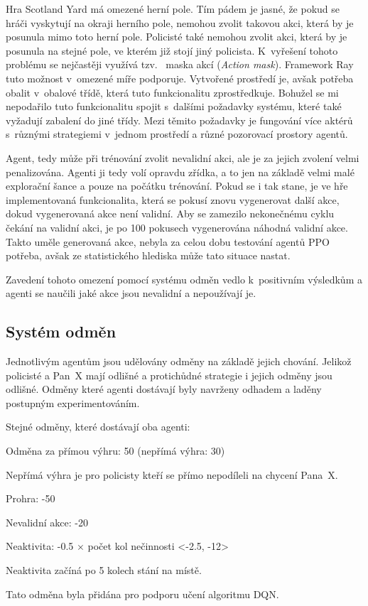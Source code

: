 Hra Scotland Yard má omezené herní pole.
Tím pádem je jasné, že pokud se hráči vyskytují na okraji herního pole, nemohou zvolit takovou akci, která by je posunula mimo toto herní pole.
Policisté také nemohou zvolit akci, která by je posunula na stejné pole, ve kterém již stojí jiný policista.
K~vyřešení tohoto problému se nejčastěji využívá tzv.~ maska akcí (\emph{Action mask}).
Framework Ray tuto možnost v~omezené míře podporuje.
Vytvořené prostředí je, avšak potřeba obalit v~obalové třídě, která tuto funkcionalitu zprostředkuje.
Bohužel se mi nepodařilo tuto funkcionalitu spojit s~dalšími požadavky systému, které také vyžadují zabalení do jiné třídy.
Mezi těmito požadavky je fungování více aktérů s~různými strategiemi v~jednom prostředí a různé pozorovací prostory agentů.

Agent, tedy může při trénování zvolit nevalidní akci, ale je za jejich zvolení velmi penalizována.
Agenti ji tedy volí opravdu zřídka, a to jen na základě velmi malé explorační šance a pouze na počátku trénování.
Pokud se i tak stane, je ve hře implementovaná funkcionalita, která se pokusí znovu vygenerovat další akce, dokud vygenerovaná akce není validní.
Aby se zamezilo nekonečnému cyklu čekání na validní akci, je po 100 pokusech vygenerována náhodná validní akce.
Takto uměle generovaná akce, nebyla za celou dobu testování agentů PPO potřeba, avšak ze statistického hlediska může tato situace nastat.

Zavedení tohoto omezení pomocí systému odměn vedlo k~positivním výsledkům a agenti se naučili jaké akce jsou nevalidní a nepoužívají je.

\subsection{Systém odměn}
\label{subsec:odmeny}

Jednotlivým agentům jsou udělovány odměny na základě jejich chování.
Jelikož policisté a Pan~X mají odlišné a protichůdné strategie i jejich odměny jsou odlišné.
Odměny které agenti dostávají byly navrženy odhadem a laděny postupným experimentováním.

\bigskip

Stejné odměny, které dostávají oba agenti:
\begin{myitemize}
  \item Odměna za přímou výhru: 50 (nepřímá výhra: 30)
  \begin{myitemize}
    \item Nepřímá výhra je pro policisty kteří se přímo nepodíleli na chycení Pana~X\@.
  \end{myitemize}
  \item Prohra: -50
  \item Nevalidní akce: -20
  \item Neaktivita: -0.5 $\times$ počet kol nečinnosti <-2.5, -12>
  \begin{myitemize}
    \item Neaktivita začíná po 5 kolech stání na místě.
    \item Tato odměna byla přidána pro podporu učení algoritmu DQN\@.
  \end{myitemize}
\end{myitemize}

